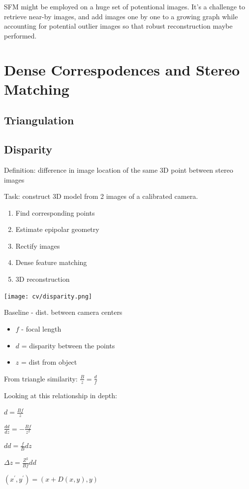 SFM might be employed on a huge set of potentional images. It's a challenge to retrieve near-by images, and add images one by one to a growing graph while accounting for potential outlier images so that robust reconstruction maybe performed. 

\section{Dense Correspodences and Stereo Matching}

\subsection{Triangulation}


\subsection{Disparity}
Definition: difference in image location of the same 3D point between stereo images

Task: construct 3D model from 2 images of a calibrated camera.

\begin{enumerate}
\item Find corresponding points
\item Estimate epipolar geometry
\item Rectify images
\item Dense feature matching
\item 3D reconstruction
\end{enumerate}

\texttt{[image: cv/disparity.png]}

Baseline - dist. between camera centers
\begin{itemize}
\item $f$ - focal length
\item $d$ = disparity between the points
\item $z$ = dist from object
\end{itemize}

From triangle similarity: $\frac{B}{z} = \frac{d}{f}$

Looking at this relationship in depth:

${d}=\frac{Bf}{z} $

$\frac{dd}{dz}=-\frac{Bf}{z^2}$

$dd = \frac{f}{B}dz$

$\Delta z = \frac{Z^2}{Bf}dd$

$(x^\prime,y^\prime)=(x+D(x,y),y)$

